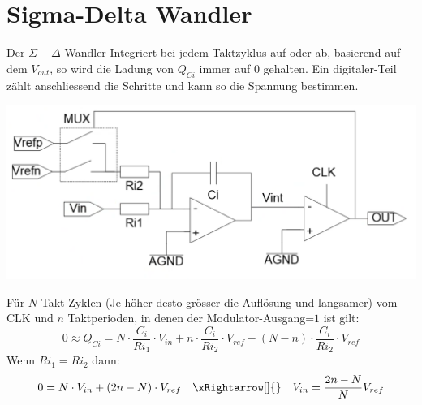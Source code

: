 \section{Sigma-Delta Wandler}
Der $\Sigma-\Delta$-Wandler Integriert bei jedem Taktzyklus auf oder ab, basierend auf dem $V_{out}$, so wird die Ladung von $Q_{Ci}$ immer auf $0$ gehalten. Ein digitaler-Teil zählt anschliessend die Schritte und kann so die Spannung bestimmen.
\begin{center}
	\includegraphics[width=0.8\columnwidth]{Images/sigma_delta}
\end{center}
Für $N$ Takt-Zyklen (Je höher desto grösser die Auflösung und langsamer) vom CLK und $n$ Taktperioden, in denen der Modulator-Ausgang=$1$ ist gilt:
\[
0 \approx Q_{Ci} = N\cdot \frac{C_i}{Ri_1}\cdot V_{in} +  n\cdot \frac{C_i}{Ri_2}\cdot V_{ref}-(N-n)\cdot \frac{C_i}{Ri_2}\cdot V_{ref}
\]
Wenn $Ri_1=Ri_2$ dann:
\[
0 = N\cdot V_{in}+(2n-N)\cdot V_{ref} \quad\xRightarrow[]{}\quad V_{in} = \frac{2n - N}{N}V_{ref}
\]